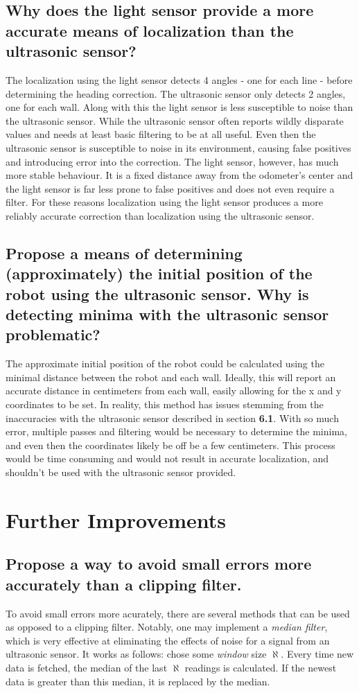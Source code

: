 \documentclass[11pt]{article}
\begin{document}
\subsection{Why does the light sensor provide a more accurate means of localization than the
ultrasonic sensor?}
\par The localization using the light sensor detects 4 angles - one for each line - before
determining the heading correction. The ultrasonic sensor only detects 2 angles, one for each wall.
Along with this the light sensor is less susceptible to noise than the ultrasonic sensor. While the
ultrasonic sensor often reports wildly disparate values and needs at least basic filtering to be at
all useful. Even then the ultrasonic sensor is susceptible to noise in its environment, causing
false positives and introducing error into the correction. The light sensor, however, has much more
stable behaviour. It is a fixed distance away from the odometer's center and the light sensor is far
less prone to false positives and does not even require a filter. For these reasons localization
using the light sensor produces a more reliably accurate correction than localization using the
ultrasonic sensor.

\subsection{Propose a means of determining (approximately) the initial position of the robot using
the ultrasonic sensor. Why is detecting minima with the ultrasonic sensor problematic?}
\par The approximate initial position of the robot could be calculated using the minimal distance
between the robot and each wall. Ideally, this will report an accurate distance in centimeters from
each wall, easily allowing for the x and y coordinates to be set. In reality, this method has issues
stemming from the inaccuracies with the ultrasonic sensor described in section \textbf{6.1}. With so
much error, multiple passes and filtering would be necessary to determine the minima, and even then
the coordinates likely be off be a few centimeters. This process would be time consuming and would
not result in accurate localization, and shouldn't be used with the ultrasonic sensor provided.

\section{Further Improvements}
\subsection{Propose a way to avoid small errors more accurately than a clipping filter.}
To avoid small errors more acurately, there are several methods that can be used as opposed to a
clipping filter. Notably, one may implement a \textit{median filter}, which is very effective at
eliminating the effects of noise for a signal from an ultrasonic sensor. It works as follows: chose
some \textit{window} size $\aleph$. Every time new data is fetched, the median of the last $\aleph$
readings is calculated. If the newest data is greater than this median, it is replaced by the
median.
\end{document}
